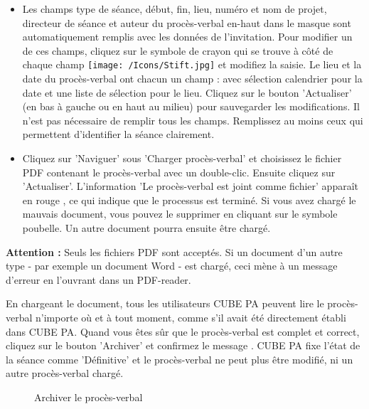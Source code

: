 \begin{itemize}
\item
Les champs type de séance, début, fin, lieu, numéro et nom de projet, directeur de séance et auteur du procès-verbal en-haut dans le masque sont automatiquement remplis avec les données de l'invitation. Pour modifier un de ces champs, cliquez sur le symbole de crayon qui se trouve à côté de chaque champ \texttt{[image: /Icons/Stift.jpg]}  et modifiez la saisie. Le lieu et la date  du procès-verbal ont chacun un champ : avec sélection calendrier pour la date et une liste de sélection pour le lieu. Cliquez sur le bouton 'Actualiser'  (en bas à gauche ou en haut au milieu) pour sauvegarder les modifications. Il n'est pas nécessaire de remplir tous les champs. Remplissez au moins ceux qui permettent d'identifier la séance clairement.
\item
Cliquez sur 'Naviguer'  sous 'Charger procès-verbal' et choisissez le fichier PDF contenant le procès-verbal avec un double-clic. Ensuite cliquez sur 'Actualiser'. L'information 'Le procès-verbal est joint comme fichier' apparaît en rouge , ce qui indique que le processus est terminé. Si vous avez chargé le mauvais document, vous pouvez le supprimer en cliquant sur le symbole poubelle. Un autre document pourra ensuite être chargé.
\end{itemize}

\vspace{\baselineskip}

\textbf{Attention :} Seuls les fichiers PDF sont acceptés. Si un document d'un autre type - par exemple un document Word - est chargé, ceci mène à un message d'erreur en l'ouvrant dans un PDF-reader.

\vspace{\baselineskip}

En chargeant le document, tous les utilisateurs CUBE PA peuvent lire le procès-verbal n'importe où et à tout moment, comme s'il avait été directement établi dans CUBE PA. Quand vous êtes sûr que le procès-verbal est complet et correct, cliquez sur le bouton 'Archiver'  et confirmez le message . CUBE PA fixe l'état de la séance comme 'Définitive' et le procès-verbal ne peut plus être modifié, ni un autre procès-verbal chargé.

\begin{figure}[H]
\caption{Archiver le procès-verbal}
\end{figure}

